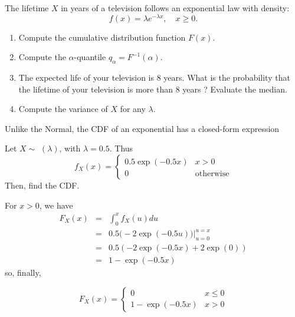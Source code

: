 \documentclass[smaller]{beamer}\usepackage[]{graphicx}\usepackage[]{color}
\begin{document}
\begin{frame}{\secname}
  \begin{example}
  \begin{footnotesize}
    The lifetime $X$ in years of a television follows an exponential law with density:
    \begin{equation*}
    f(x)=\lambda e^{-\lambda x} ,\quad x\geq 0.
    \end{equation*}
    \begin{enumerate}
      \item Compute the cumulative distribution function $F(x)$.
      \item Compute the $\alpha$-quantile $q_\alpha=F^{-1}(\alpha)$.
      \item The expected life of your television is $8$ years. What is the probability that the lifetime of your television is more than $8$ years ?
      Evaluate the median.
      \item Compute the variance of $X$ for any $\lambda$.
    \end{enumerate}
  \end{footnotesize}
  \end{example}
\end{frame}


\begin{frame}{\secname}

Unlike the Normal, the CDF of an exponential has a closed-form expression

  \begin{example}
  \begin{footnotesize}

  Let $X\sim$ $(\lambda)$, with $\lambda =0.5$. Thus
  $$f_X(x) = \left\{ \begin{array}{ll}
  0.5 \exp (-0.5x) & x>0\\
  0 & \text{otherwise}
  \end{array} \right.$$
  Then, find the CDF.
  \pause

  \medskip

  For $x>0$, we have
  \begin{eqnarray*}
  F_{X}(x) & = & \int_{0}^{x}f_{X}(u)du\\
  & = & 0.5\Big( -2\exp (-0.5u)\Big) \bigl|_{u=0}^{u=x}\\
  & = & 0.5(-2\exp (-0.5x)+2\exp (0))\\
  & = & 1-\exp (-0.5x)
  \end{eqnarray*}
  \pause
  so, finally,

  $$F_X(x) = \left\{ \begin{array}{ll}
  0 & x \leq 0 \\
  1-\exp (-0.5x)& x>0
  \end{array} \right.$$
  \end{footnotesize}
  \end{example}
\end{frame}
\end{document}
